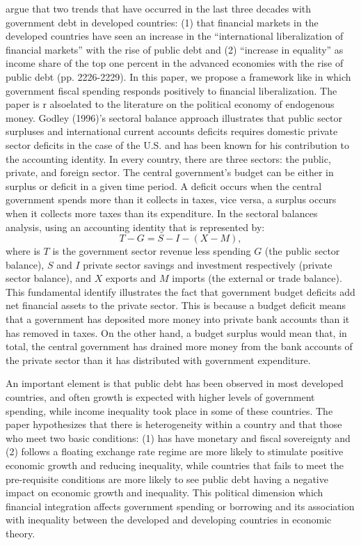 \documentclass[12pt, titlepage]{article}
\numberwithin{equation}{section}
\begin{document}
\cite{Azzimonti2014} argue that two trends that have occurred in the last three decades with government debt in developed countries: (1) that financial markets in the developed countries have seen an increase in the “international liberalization of financial markets” with the rise of public debt and (2) “increase in equality” as income share of the top one percent in the advanced economies with the rise of public debt (pp. 2226-2229). 
In this paper, we propose a framework like \cite{Azzimonti2014} in which government fiscal spending responds positively to financial liberalization.
The paper is r alsoelated to the literature on the political economy of endogenous money. Godley (1996)’s sectoral balance approach illustrates that public sector surpluses and international current accounts deficits requires domestic private sector deficits in the case of the U.S. and has been known for his contribution to the accounting identity. In every country, there are three sectors: the public, private, and foreign sector. The central government’s budget can be either in surplus or deficit in a given time period. A deficit occurs when the central government spends more than it collects in taxes, vice versa, a surplus occurs when it collects more taxes than its expenditure. In the sectoral balances analysis, using an accounting identity that is represented by: 
\[
T - G = S - I - (X - M),
\]
where is $T$ is the government sector revenue less spending $G$ (the public sector balance), $S$ and $I$ private sector savings and investment respectively (private sector balance), and $X$ exports and $M$ imports (the external or trade balance). This fundamental identify illustrates the fact that government budget deficits add net financial assets to the private sector. This is because a budget deficit means that a government has deposited more money into private bank accounts than it has removed in taxes. On the other hand, a budget surplus would mean that, in total, the central government has drained more money from the bank accounts of the private sector than it has distributed with government expenditure. 

An important element is that public debt has been observed in most developed countries, and often growth is expected with higher levels of government spending, while income inequality took place in some of these countries. The paper hypothesizes that there is heterogeneity within a country and that those who meet two basic conditions: (1) has have monetary and fiscal sovereignty and (2) follows a floating exchange rate regime are more likely to stimulate positive economic growth and reducing inequality, while countries that fails to meet the pre-requisite conditions are more likely to see public debt having a negative impact on economic growth and inequality. This political dimension which financial integration affects government spending or borrowing and its association with inequality between the developed and developing countries in economic theory.
\end{document}
